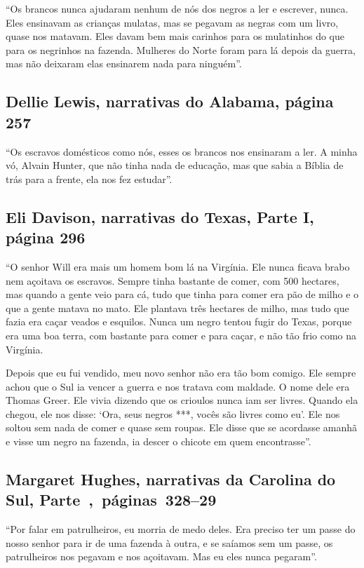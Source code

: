 ``Os brancos nunca ajudaram nenhum de nós dos negros a ler e escrever,
nunca. Eles ensinavam as crianças mulatas, mas se pegavam as negras com
um livro, quase nos matavam. Eles davam bem mais carinhos para os
mulatinhos do que para os negrinhos na fazenda. Mulheres do Norte foram
para lá depois da guerra, mas não deixaram elas ensinarem nada para
ninguém''.

\subsection{Dellie Lewis, narrativas do Alabama, página 257}
\label{ref170}

``Os escravos domésticos como nós, esses os brancos nos ensinaram a ler.
A minha vó, Alvain Hunter, que não tinha nada de educação, mas que sabia
a Bíblia de trás para a frente, ela nos fez estudar''.

\subsection{Eli Davison, narrativas do Texas, Parte I, página 296} \label{ref69}

``O senhor Will era mais um homem bom lá na Virgínia. Ele nunca ficava
brabo nem açoitava os escravos. Sempre tinha bastante de comer, com 500
hectares, mas quando a gente veio para cá, tudo que tinha para comer era
pão de milho e o que a gente matava no mato. Ele plantava três hectares
de milho, mas tudo que fazia era caçar veados e esquilos. Nunca um negro
tentou fugir do Texas, porque era uma boa terra, com bastante para comer
e para caçar, e não tão frio como na Virgínia.

Depois que eu fui vendido, meu novo senhor não era tão bom comigo. Ele
sempre achou que o Sul ia vencer a guerra e nos tratava com maldade. O
nome dele era Thomas Greer. Ele vivia dizendo que os crioulos nunca iam
ser livres. Quando ela chegou, ele nos disse: `Ora, seus negros ***,
vocês são livres como eu'. Ele nos soltou sem nada de comer e quase sem
roupas. Ele disse que se acordasse amanhã e visse um negro na fazenda,
ia descer o chicote em quem encontrasse''.

\subsection{Margaret Hughes, narrativas da Carolina do Sul, Parte~,~páginas~328--29}
\label{ref153}

``Por falar em patrulheiros, eu morria de medo deles. Era preciso ter um
passe do nosso senhor para ir de uma fazenda à outra, e se saíamos sem
um passe, os patrulheiros nos pegavam e nos açoitavam. Mas eu eles nunca
pegaram''.

